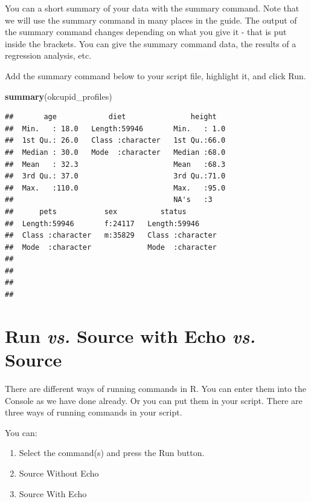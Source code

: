 \documentclass[
]{krantz}
\makeatletter
\newenvironment{Shaded}{\begin{snugshade}}{\end{snugshade}}
\newcommand{\KeywordTok}[1]{\textcolor[rgb]{0.27,0.27,0.27}{\textbf{#1}}}
\newcommand{\NormalTok}[1]{#1}
\providecommand{\tightlist}{%
  \setlength{\itemsep}{0pt}\setlength{\parskip}{0pt}}
\newenvironment{kframe}{%
\medskip{}
\setlength{\fboxsep}{.8em}
 \def\at@end@of@kframe{}%
 \ifinner\ifhmode%
  \def\at@end@of@kframe{\end{minipage}}%
  \begin{minipage}{\columnwidth}%
 \fi\fi%
 \def\FrameCommand##1{\hskip\@totalleftmargin \hskip-\fboxsep
 \colorbox{shadecolor}{##1}\hskip-\fboxsep
     \hskip-\linewidth \hskip-\@totalleftmargin \hskip\columnwidth}%
 \MakeFramed {\advance\hsize-\width
   \@totalleftmargin\z@ \linewidth\hsize
   \@setminipage}}%
 {\par\unskip\endMakeFramed%
 \at@end@of@kframe}
\renewenvironment{Shaded}{\begin{kframe}}{\end{kframe}}
\makeatother
\begin{document}
You can a short summary of your data with the summary command. Note that we will use the summary command in many places in the guide. The output of the summary command changes depending on what you give it - that is put inside the brackets. You can give the summary command data, the results of a regression analysis, etc.

Add the summary command below to your script file, highlight it, and click Run.

\begin{Shaded}
\begin{Highlighting}[]
\KeywordTok{summary}\NormalTok{(okcupid_profiles)}
\end{Highlighting}
\end{Shaded}

\begin{verbatim}
##       age            diet               height    
##  Min.   : 18.0   Length:59946       Min.   : 1.0  
##  1st Qu.: 26.0   Class :character   1st Qu.:66.0  
##  Median : 30.0   Mode  :character   Median :68.0  
##  Mean   : 32.3                      Mean   :68.3  
##  3rd Qu.: 37.0                      3rd Qu.:71.0  
##  Max.   :110.0                      Max.   :95.0  
##                                     NA's   :3     
##      pets           sex          status         
##  Length:59946       f:24117   Length:59946      
##  Class :character   m:35829   Class :character  
##  Mode  :character             Mode  :character  
##                                                 
##                                                 
##                                                 
## 
\end{verbatim}

\hypertarget{run-vs.-source-with-echo-vs.-source}{%
\section{\texorpdfstring{Run \emph{vs.} Source with Echo \emph{vs.} Source}{Run vs. Source with Echo vs. Source}}\label{run-vs.-source-with-echo-vs.-source}}

There are different ways of running commands in R. You can enter them into the Console as we have done already. Or you can put them in your script. There are three ways of running commands in your script.

You can:

\begin{enumerate}
\def\labelenumi{\arabic{enumi}.}
\tightlist
\item
  Select the command(s) and press the Run button.
\item
  Source Without Echo
\item
  Source With Echo
\end{enumerate}
\end{document}
